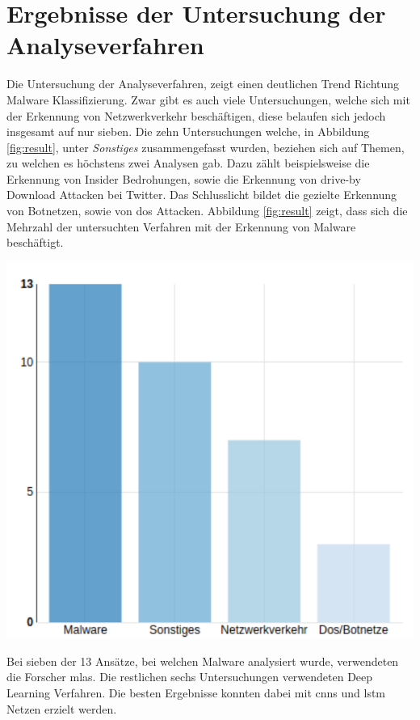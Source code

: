 \documentclass[
    12pt, %
    DIV10,
    ngerman, %
    a4paper, %
    oneside, %
    titlepage, %
    parskip=half, %
    headings=normal, %
    listof=totoc, %
    bibliography=totoc, %
    index=totoc, %
    captions=tableheading, %
    final %
]{scrreprt}
\begin{document}
\section{Ergebnisse der Untersuchung der Analyseverfahren}\label{sec:ergebnis}
Die Untersuchung der Analyseverfahren, zeigt einen deutlichen Trend Richtung Malware Klassifizierung. Zwar gibt es auch viele Untersuchungen, welche sich mit der Erkennung von Netzwerkverkehr beschäftigen, diese belaufen sich jedoch insgesamt auf nur sieben. Die zehn Untersuchungen welche, in Abbildung \ref{fig:result}, unter \emph{Sonstiges} zusammengefasst wurden, beziehen sich auf Themen, zu welchen es höchstens zwei Analysen gab. Dazu zählt beispielsweise die Erkennung von Insider Bedrohungen, sowie die Erkennung von drive-by Download Attacken bei Twitter. Das Schlusslicht bildet die gezielte Erkennung von Botnetzen, sowie von \ac{dos} Attacken. Abbildung \ref{fig:result} zeigt, dass sich die Mehrzahl der untersuchten Verfahren mit der Erkennung von Malware beschäftigt.
\begin{center}
\includegraphics[scale=0.7]{img/res.pdf}
\label{fig:result}
\end{center}
Bei sieben der 13 Ansätze, bei welchen Malware analysiert wurde, verwendeten die Forscher \ac{mlas}. Die restlichen sechs Untersuchungen verwendeten Deep Learning Verfahren. Die besten Ergebnisse konnten dabei mit \ac{cnns} und \ac{lstm} Netzen erzielt werden.\\
\end{document}
